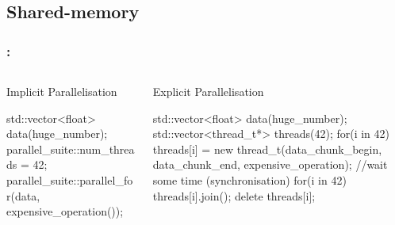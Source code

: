 \documentclass[9pt,xcolor=table]{beamer}
\begin{document}
\subsection{Shared-memory}
\begin{frame}[fragile]
  \frametitle{\insertsectionhead{}: \insertsubsectionhead{}}
  \begin{columns}[t]
    
    \begin{column}{.45\textwidth}
      \begin{block}{Implicit Parallelisation}
        \begin{pyglist}[language=c++,numbers=left,style=emacs]
          std::vector<float> data(huge_number);
          parallel_suite::num_threads = 42;
          parallel_suite::parallel_for(data, expensive_operation());
        \end{pyglist}
      \end{block}
    \end{column}
    \pause
    \begin{column}{.45\textwidth}
      \begin{block}{Explicit Parallelisation}
        \begin{pyglist}[language=c++,numbers=left,style=emacs]
          std::vector<float> data(huge_number);
          std::vector<thread_t*> threads(42);
          for(i in 42){
            threads[i] = new thread_t(data_chunk_begin, data_chunk_end, expensive_operation);
          }
          //wait some time (synchronisation)
          for(i in 42){
            threads[i].join();
            delete threads[i];
          }
        \end{pyglist}
      \end{block}
    \end{column}
    
  \end{columns}
\end{frame}
\end{document}
